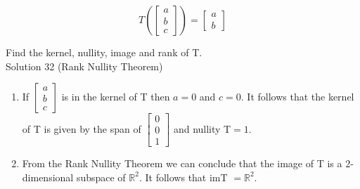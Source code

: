 \documentclass[10pt]{article}
\begin{document}
$$
T\left(\left[\begin{array}{l}
a \\
b \\
c
\end{array}\right]\right)=\left[\begin{array}{l}
a \\
b
\end{array}\right]
$$

Find the kernel, nullity, image and rank of T.\\
Solution 32 (Rank Nullity Theorem)

\begin{enumerate}
  \item If $\left[\begin{array}{l}a \\ b \\ c\end{array}\right]$ is in the kernel of T then $a=0$ and $c=0$. It follows that the kernel of T is given by the span of $\left[\begin{array}{l}0 \\ 0 \\ 1\end{array}\right]$ and nullity $\mathrm{T}=1$.
  \item From the Rank Nullity Theorem we can conclude that the image of T is a 2-dimensional subspace of $\mathbb{R}^{2}$. It follows that imT $=\mathbb{R}^{2}$.
\end{enumerate}
\end{document}
